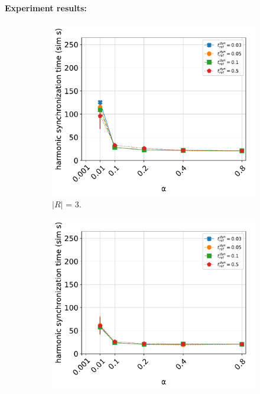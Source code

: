 		\paragraph{Experiment results:\nl}
		
		\begin{figure}[ht!]
		  \begin{subfigure}[b]{0.5\textwidth}
			\centering\captionsetup{width=.9\linewidth}%
			\includegraphics[width=\textwidth]{Assets/DocSegments/Chapters/ExperimentsAndResults/Figures/PerfScores/t_ref_dyn_x_alpha_hyperparamtuning_experiment_plot_collsize3.pdf}
			\caption{$|R|$ = 3.}
			\label{fig:sub:t_ref_dyn_x_alpha_collsize3}
		  \end{subfigure}
		  \begin{subfigure}[b]{0.5\textwidth}
			\centering\captionsetup{width=.9\linewidth}%
			\includegraphics[width=\textwidth]{Assets/DocSegments/Chapters/ExperimentsAndResults/Figures/PerfScores/t_ref_dyn_x_alpha_hyperparamtuning_experiment_plot_collsize10.pdf}

\end{subfigure}
\end{figure}
